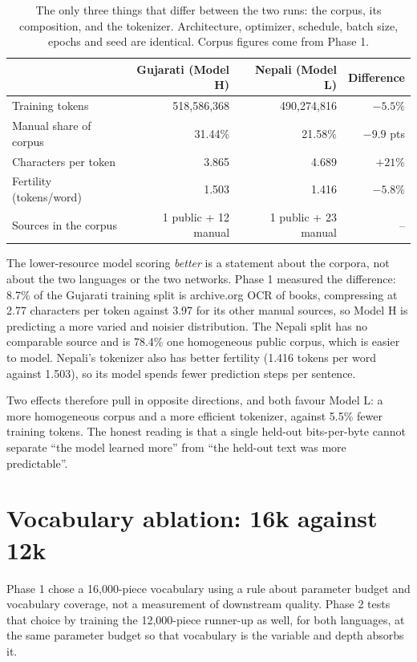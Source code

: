 \documentclass[11pt,a4paper]{article}
\begin{document}
\begin{table}[H]
\centering
\small
\begin{tabular}{lrrr}
\toprule
\textbf{} & \textbf{Gujarati (Model H)} & \textbf{Nepali (Model L)} & \textbf{Difference} \\
\midrule
Training tokens & 518,586,368 & 490,274,816 & $-5.5\%$ \\
Manual share of corpus & 31.44\% & 21.58\% & $-9.9$ pts \\
Characters per token & 3.865 & 4.689 & $+21\%$ \\
Fertility (tokens/word) & 1.503 & 1.416 & $-5.8\%$ \\
Sources in the corpus & 1 public + 12 manual & 1 public + 23 manual & -- \\
\bottomrule
\end{tabular}
\caption{The only three things that differ between the two runs: the corpus, its composition, and the tokenizer. Architecture, optimizer, schedule, batch size, epochs and seed are identical. Corpus figures come from Phase 1.}
\label{tab:compare}
\end{table}



The lower-resource model scoring \emph{better} is a statement about the corpora,
not about the two languages or the two networks. Phase 1 measured the difference:
8.7\% of the Gujarati training split is archive.org OCR of books, compressing at
2.77 characters per token against 3.97 for its other manual sources, so Model H
is predicting a more varied and noisier distribution. The Nepali split has no
comparable source and is 78.4\% one homogeneous public corpus, which is easier to
model. Nepali's tokenizer also has better fertility (1.416 tokens per word
against 1.503), so its model spends fewer prediction steps per sentence.

Two effects therefore pull in opposite directions, and both favour Model L: a
more homogeneous corpus and a more efficient tokenizer, against 5.5\% fewer
training tokens. The honest reading is that a single held-out bits-per-byte
cannot separate ``the model learned more'' from ``the held-out text was more
predictable''.


\section{Vocabulary ablation: 16k against 12k}


Phase 1 chose a 16{,}000-piece vocabulary using a rule about parameter budget and
vocabulary coverage, not a measurement of downstream quality. Phase 2 tests that
choice by training the 12{,}000-piece runner-up as well, for both languages, at
the same parameter budget so that vocabulary is the variable and depth absorbs
it.
\end{document}
